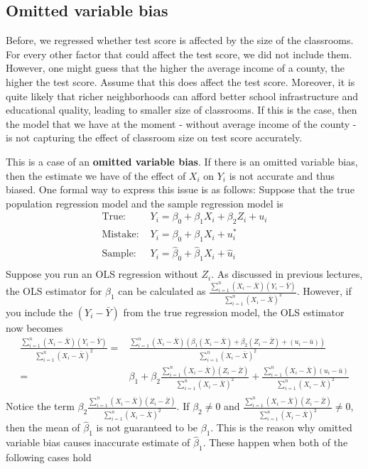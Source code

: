 \documentclass[12pt]{article}
\theoremstyle{definition}
\theoremstyle{property}
\theoremstyle{assumption}
\theoremstyle{example}
\theoremstyle{comment}
\begin{document}
\subsection{Omitted variable bias}
Before, we regressed whether test score is affected by the size of the classrooms. For every other factor that could affect the test score, we did not include them. However, one might guess that the higher the average income of a county, the higher the test score. Assume that this does affect the test score. Moreover, it is quite likely that richer neighborhoods can afford better school infrastructure and educational quality, leading to smaller size of classrooms. If this is the case, then the model that we have at the moment - without average income of the county - is not capturing the effect of classroom size on test score accurately. \par\medskip 
This is a case of an \textbf{omitted variable bias}. If there is an omitted variable bias, then the estimate we have of the effect of $X_i$ on $Y_i$ is not accurate and thus biased. One formal way to express this issue is as follows: Suppose that the true population regression model and the sample regression model is 
\[
\begin{aligned}
\text{True: }& Y_i = \beta_0 + \beta_1 X_i + \beta_2 Z_i+u_i\\
\text{Mistake: }& Y_i = \beta_0 + \beta_1 X_i + u_i^*\\
\text{Sample: }& Y_i = \hat{\beta}_0 + \hat{\beta}_1 X_i+ \hat{u}_i\\
\end{aligned}
\]
Suppose you run an OLS regression without $Z_i$. As discussed in previous lectures, the OLS estimator for $\beta_1$ can be calculated as $\frac{\sum_{i=1}^n(X_i-\bar{X})(Y_i-\bar{Y})}{\sum_{i=1}^n(X_i-\bar{X})^2}$. However, if you include the $(Y_i-\bar{Y})$ from the true regression model, the OLS estimator now becomes
\[
\begin{aligned}
\frac{\sum_{i=1}^n(X_i-\bar{X})(Y_i-\bar{Y})}{\sum_{i=1}^n(X_i-\bar{X})^2} =& \frac{\sum_{i=1}^n(X_i-\bar{X})(\beta_1(X_i-\bar{X})+\beta_2(Z_i-\bar{Z})+(u_i-\bar{u}))}{\sum_{i=1}^n(X_i-\bar{X})^2}\\
=& \beta_1 + \beta_2\frac{\sum_{i=1}^n(X_i-\bar{X})(Z_i-\bar{Z})}{\sum_{i=1}^n(X_i-\bar{X})^2}+\frac{\sum_{i=1}^n(X_i-\bar{X})(u_i-\bar{u})}{\sum_{i=1}^n(X_i-\bar{X})^2}\\
\end{aligned}
\]
Notice the term $\beta_2\frac{\sum_{i=1}^n(X_i-\bar{X})(Z_i-\bar{Z})}{\sum_{i=1}^n(X_i-\bar{X})^2}$. If $\beta_2 \neq0$ and $\frac{\sum_{i=1}^n(X_i-\bar{X})(Z_i-\bar{Z})}{\sum_{i=1}^n(X_i-\bar{X})^2}\neq 0$, then the mean of $\hat{\beta}_1$ is not guaranteed to be $\beta_1$. This is the reason why omitted variable bias causes inaccurate estimate of $\hat{\beta}_1$. These happen when both of the following cases hold
\end{document}
